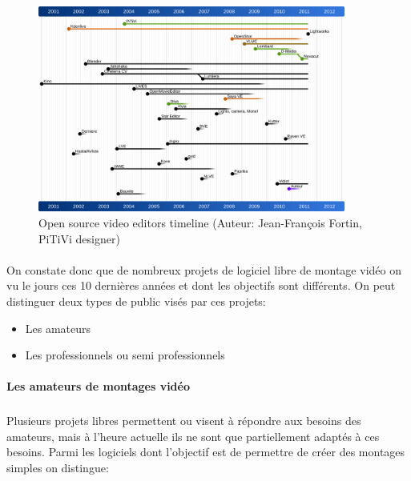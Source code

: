 \begin{figure} [h]
  \begin{center}
    \includegraphics[width=0.9\textwidth]{images/open-source-video-editor-timeline}
  \end{center} \caption{Open source video editors timeline (Auteur:
  Jean-François Fortin, PiTiVi designer)} \label{Yes}
\end{figure}

\paragraph{ }

On constate donc que de nombreux projets de logiciel libre de montage
vidéo on vu le jours ces 10 dernières années et dont les objectifs
sont différents.  On peut distinguer deux types de public visés par
ces projets:

\begin {itemize}

  \item {Les amateurs}

  \item {Les professionnels ou semi professionnels}
\end {itemize}

\paragraph {Les amateurs de montages vidéo}

\subparagraph{}

Plusieurs projets libres permettent ou visent à répondre aux besoins
des amateurs, mais à l'heure actuelle ils ne sont que partiellement
adaptés à ces besoins. Parmi les logiciels dont l'objectif est de
permettre de créer des montages simples on distingue:

